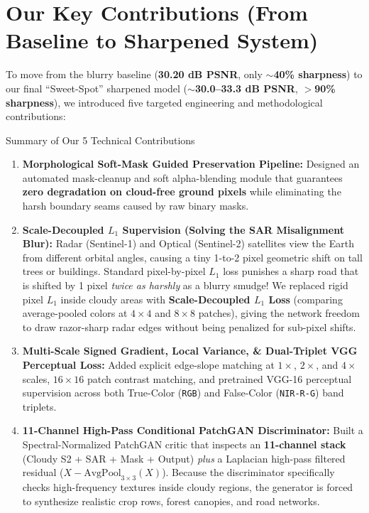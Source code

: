 \documentclass[11pt,a4paper]{article}
\begin{document}
\section{Our Key Contributions (From Baseline to Sharpened System)}

To move from the blurry baseline (\textbf{30.20 dB PSNR}, only \textbf{$\sim$40\% sharpness}) to our final ``Sweet-Spot'' sharpened model (\textbf{$\sim$30.0--33.3 dB PSNR}, \textbf{$>$90\% sharpness}), we introduced five targeted engineering and methodological contributions:

\begin{contribbox}{Summary of Our 5 Technical Contributions}
\begin{enumerate}[leftmargin=1.5em, itemsep=5pt, topsep=2pt]
    \item \textbf{Morphological Soft-Mask Guided Preservation Pipeline:}
    Designed an automated mask-cleanup and soft alpha-blending module that guarantees \textbf{zero degradation on cloud-free ground pixels} while eliminating the harsh boundary seams caused by raw binary masks.

    \item \textbf{Scale-Decoupled $L_1$ Supervision (Solving the SAR Misalignment Blur):}
    Radar (Sentinel-1) and Optical (Sentinel-2) satellites view the Earth from different orbital angles, causing a tiny 1-to-2 pixel geometric shift on tall trees or buildings. Standard pixel-by-pixel $L_1$ loss punishes a sharp road that is shifted by 1 pixel \textit{twice as harshly} as a blurry smudge! We replaced rigid pixel $L_1$ inside cloudy areas with \textbf{Scale-Decoupled $L_1$ Loss} (comparing average-pooled colors at $4\times 4$ and $8\times 8$ patches), giving the network freedom to draw razor-sharp radar edges without being penalized for sub-pixel shifts.

    \item \textbf{Multi-Scale Signed Gradient, Local Variance, \& Dual-Triplet VGG Perceptual Loss:}
    Added explicit edge-slope matching at $1\times$, $2\times$, and $4\times$ scales, $16\times 16$ patch contrast matching, and pretrained VGG-16 perceptual supervision across both True-Color (\texttt{RGB}) and False-Color (\texttt{NIR-R-G}) band triplets.

    \item \textbf{11-Channel High-Pass Conditional PatchGAN Discriminator:}
    Built a Spectral-Normalized PatchGAN critic that inspects an \textbf{11-channel stack} (Cloudy S2 + SAR + Mask + Output) \textit{plus} a Laplacian high-pass filtered residual ($X - \text{AvgPool}_{3\times 3}(X)$). Because the discriminator specifically checks high-frequency textures inside cloudy regions, the generator is forced to synthesize realistic crop rows, forest canopies, and road networks.


\end{enumerate}
\end{contribbox}
\end{document}
